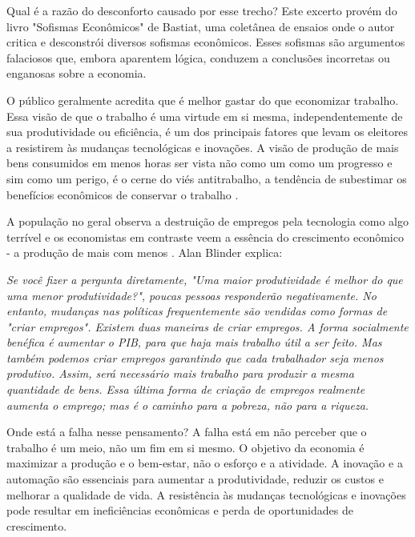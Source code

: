 Qual é a razão do desconforto causado por esse trecho? Este excerto provém do livro "Sofismas Econômicos" de Bastiat, uma coletânea de ensaios onde o autor critica e desconstrói diversos sofismas econômicos. Esses sofismas são argumentos falaciosos que, embora aparentem lógica, conduzem a conclusões incorretas ou enganosas sobre a economia.

O público geralmente acredita que é melhor gastar do que economizar trabalho. Essa visão de que o trabalho é uma virtude em si mesma, independentemente de sua produtividade ou eficiência, é um dos principais fatores que levam os eleitores a resistirem às mudanças tecnológicas e inovações. A visão de produção de mais bens consumidos em menos horas ser vista não como um como um progresso e sim como um perigo, é o cerne do viés antitrabalho, a tendência de subestimar os benefícios econômicos de conservar o trabalho \cite{The_Myth_of_the_Rational_Voter}.

A população no geral observa a destruição de empregos pela tecnologia como algo terrível e os economistas em contraste veem a essência do crescimento econômico - a produção de mais com menos \cite{Myths-of-Rich-and-Poor,krugman2015accidental,davis1996job,innocence_and_design,bastiat1995selected}. Alan Blinder explica:

\begin{citacao}
    \textit{
        Se você fizer a pergunta diretamente, "Uma maior produtividade é melhor do que uma menor produtividade?", poucas pessoas responderão negativamente. No entanto, mudanças nas políticas frequentemente são vendidas como formas de "criar empregos". Existem duas maneiras de criar empregos. A forma socialmente benéfica é aumentar o PIB, para que haja mais trabalho útil a ser feito. Mas também podemos criar empregos garantindo que cada trabalhador seja menos produtivo. Assim, será necessário mais trabalho para produzir a mesma quantidade de bens. Essa última forma de criação de empregos realmente aumenta o emprego; mas é o caminho para a pobreza, não para a riqueza.
    } \newline
    \cite{blinder1987hard}
\end{citacao}

Onde está a falha nesse pensamento? A falha está em não perceber que o trabalho é um meio, não um fim em si mesmo. O objetivo da economia é maximizar a produção e o bem-estar, não o esforço e a atividade. A inovação e a automação são essenciais para aumentar a produtividade, reduzir os custos e melhorar a qualidade de vida. A resistência às mudanças tecnológicas e inovações pode resultar em ineficiências econômicas e perda de oportunidades de crescimento.

